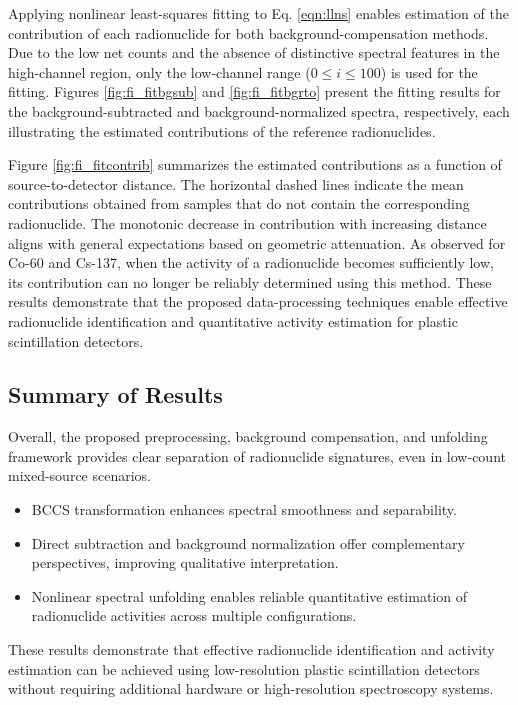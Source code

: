 \documentclass[10pt]{wlscirep}
\begin{document}
Applying nonlinear least-squares fitting to Eq. \ref{eqn:llns} enables estimation of the contribution of each radionuclide for both background-compensation methods. Due to the low net counts and the absence of distinctive spectral features in the high-channel region, only the low-channel range ($0 \le i \le 100$) is used for the fitting. Figures \ref{fig:fi_fitbgsub} and \ref{fig:fi_fitbgrto} present the fitting results for the background-subtracted and background-normalized spectra, respectively, each illustrating the estimated contributions of the reference radionuclides.

Figure \ref{fig:fi_fitcontrib} summarizes the estimated contributions as a function of source-to-detector distance. The horizontal dashed lines indicate the mean contributions obtained from samples that do not contain the corresponding radionuclide. The monotonic decrease in contribution with increasing distance aligns with general expectations based on geometric attenuation. As observed for Co-60 and Cs-137, when the activity of a radionuclide becomes sufficiently low, its contribution can no longer be reliably determined using this method. These results demonstrate that the proposed data-processing techniques enable effective radionuclide identification and quantitative activity estimation for plastic scintillation detectors.

\subsection*{Summary of Results}

Overall, the proposed preprocessing, background compensation, and unfolding framework provides clear separation of radionuclide signatures, even in low-count mixed-source scenarios.

\begin{itemize}
    \item BCCS transformation enhances spectral smoothness and separability.
    \item Direct subtraction and background normalization offer complementary perspectives, improving qualitative interpretation.
    \item Nonlinear spectral unfolding enables reliable quantitative estimation of radionuclide activities across multiple configurations.
\end{itemize}

These results demonstrate that effective radionuclide identification and activity estimation can be achieved using low-resolution plastic scintillation detectors without requiring additional hardware or high-resolution spectroscopy systems.
\end{document}
